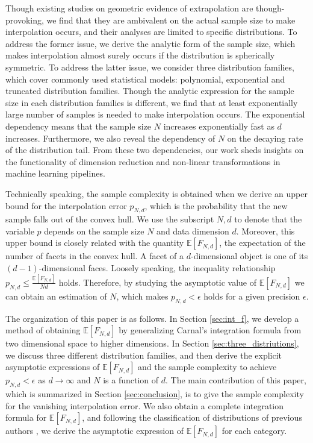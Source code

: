 \documentclass[conference,a4paper]{IEEEtran}
\def\E{\mathbb{E}}
\begin{document}
Though existing studies on geometric evidence of extrapolation are though-provoking,
we find that they are ambivalent on the actual sample size
to make interpolation occurs, and
their analyses are limited to specific distributions.
To address the former issue, we derive the analytic form of the sample size, which makes
interpolation almost surely occurs if the distribution is spherically symmetric.
To address the latter issue,
we consider three distribution families, which cover commonly used statistical models:
polynomial,
exponential and truncated distribution families.
Though the analytic expression for the sample size in each distribution families
is different, we find that at least exponentially large number of samples is needed to make interpolation occurs.
The exponential dependency means that the sample size $N$ increases exponentially fast as $d$ increases.
Furthermore, we also reveal the dependency of $N$ on the decaying rate of the distribution tail.
From these two dependencies, our work sheds insights on
the functionality of dimension reduction and non-linear transformations in machine learning pipelines.


Technically speaking, the sample complexity is obtained when we derive an upper bound for the interpolation error
$p_{N,d}$,
which is the probability that the new sample falls out of the convex hull.
We use the subscript $N,d$ to denote that the variable $p$ depends on the sample size $N$ and data dimension $d$.
Moreover, this upper bound is closely related with the quantity $\E[F_{N,d}]$,
the expectation of the number of facets in the convex hull. A facet of a $d$-dimensional object is one of its $(d-1)$-dimensional faces.
Loosely speaking,
the inequality relationship $p_{N,d} \leq \frac{\E[F_{N,d}]}{Nd}$ holds. 
Therefore, by studying the asymptotic value of $\E[F_{N,d}]$ we can obtain an estimation of $N$, which makes $p_{N,d}<\epsilon$ holds
for a given precision $\epsilon$.

The organization of this paper is as follows. In Section \ref{sec:int_f}, we develop a method of obtaining $\E[F_{N,d}]$ by generalizing Carnal's integration formula
from two dimensional space to higher dimensions.
In Section \ref{sec:three_distriutions}, we discuss three different distribution families, and then derive the explicit asymptotic
expressions of $\E[F_{N,d}]$ and the sample complexity to achieve $p_{N,d}<\epsilon$ as $d\to\infty$ and $N$ is a function of $d$.
The main contribution of this paper,
which is summarized in Section \ref{sec:conclusion},
is to give the sample complexity for the vanishing interpolation error.
We also obtain a complete integration formula for $\E[F_{N,d}]$,
and following the classification of distributions of previous authors \cite{carnal1970konvexe,dwyer1991convex},
we derive the asymptotic expression
of $\E[F_{N,d}]$ for each category.
\end{document}
